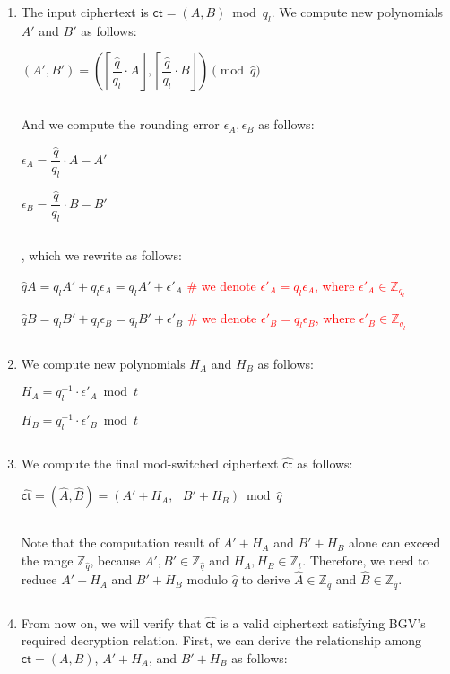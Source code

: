 \begin{enumerate}


\item The input ciphertext is $\textsf{ct} = (A, B) \bmod q_l$. We compute new polynomials $A'$ and $B'$ as follows:

$(A', B') = \left(\left\lceil\dfrac{\hat{q}}{q_l}\cdot A\right\rfloor, \left\lceil\dfrac{\hat{q}}{q_l}\cdot B\right\rfloor\right) \pmod{\hat{q}}$

$ $

And we compute the rounding error $\epsilon_A, \epsilon_B$ as follows: 

$\epsilon_A = \dfrac{\hat{q}}{q_l}\cdot A - A'$

$\epsilon_B = \dfrac{\hat{q}}{q_l}\cdot B - B'$


$ $

, which we rewrite as follows:

$\hat{q} A = q_{l} A' + q_{l}\epsilon_A = q_{l} A' + \epsilon'_A$ \textcolor{red}{ \# we denote $\epsilon'_A = q_{l}\epsilon_A$, where $\epsilon'_A \in \mathbb{Z}_{q_l}$}

$\hat{q} B = q_{l} B' + q_{l}\epsilon_B = q_{l} B' + \epsilon'_B$ \textcolor{red}{ \# we denote $\epsilon'_B = q_{l}\epsilon_B$, where $\epsilon'_B \in \mathbb{Z}_{q_l}$}

$ $

\item We compute new polynomials $H_A$ and $H_B$ as follows:

$H_A = q_l^{-1}\cdot\epsilon'_A \bmod t$

$H_B = q_l^{-1}\cdot\epsilon'_B \bmod t$

$ $

\item We compute the final mod-switched ciphertext $\hat{\textsf{ct}}$ as follows:

$\hat{\textsf{ct}} = (\hat{A}, \hat{B}) = (A' + H_A, \text{ } B' + H_B) \bmod \hat{q}$

$ $

Note that the computation result of $A' + H_A$ and $B' + H_B$ alone can exceed the range $\mathbb{Z}_{\hat{q}}$, because $A', B' \in \mathbb{Z}_{\hat{q}}$ and $H_A, H_B \in \mathbb{Z}_t$. Therefore, we need to reduce $A' + H_A$ and $B' + H_B$ modulo $\hat{q}$  to derive $\hat{A} \in \mathbb{Z}_{\hat{q}}$ and $\hat{B} \in \mathbb{Z}_{\hat{q}}$. 

$ $

\item From now on, we will verify that $\hat{\textsf{ct}}$ is a valid ciphertext satisfying BGV's required decryption relation. First, we can derive the relationship among $\textsf{ct} = (A, B)$, $A' + H_A$, and $B' + H_B$ as follows:


\end{enumerate}
